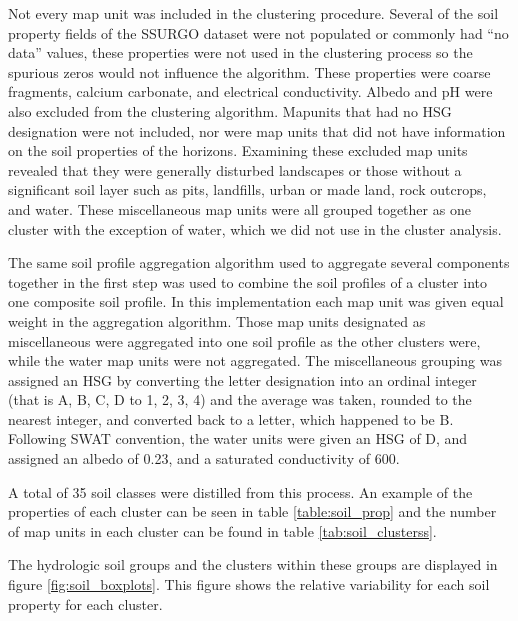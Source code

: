 Not every map unit was included in the clustering procedure. Several of the soil property fields of the SSURGO dataset were not populated or commonly had ``no data'' values, these properties were not used in the
clustering process so the spurious zeros would not influence the algorithm. These properties were coarse fragments, calcium carbonate, and electrical conductivity. Albedo and pH were also excluded from the clustering algorithm. Mapunits that had no HSG designation were not included, nor were map units that did not have information on the soil properties of the horizons. Examining these excluded map units revealed that they were generally disturbed landscapes or those without a significant soil layer such as pits, landfills, urban or made land, rock outcrops, and water. These miscellaneous map units were all grouped together as one cluster with the exception of water, which we did not use in the cluster analysis.

The same soil profile aggregation algorithm \citep{beaudette_algorithms_2013}
used to aggregate several components together in the first step was used to combine the soil profiles of a cluster into one
composite soil profile. In this implementation each map unit was given equal
weight in the aggregation algorithm. Those map units designated as miscellaneous
were aggregated into one soil profile as the other clusters were, while the
water map units were not aggregated. The miscellaneous grouping was assigned an
HSG by converting the letter designation into an ordinal
integer (that is A, B, C, D to 1, 2, 3, 4) and the average was taken, rounded to
the nearest integer, and converted back to a letter, which happened to be B. Following SWAT convention, the water units
were given an HSG of D, and assigned an albedo of 0.23, and a saturated conductivity
of 600.

A total of 35 soil classes were distilled from this process. An example of the properties of each cluster can be seen in table \ref{table:soil_prop} and the number of map units in each cluster can be found in table \ref{tab:soil_clusterss}. 

The hydrologic soil groups and the clusters within these groups are displayed in figure \ref{fig:soil_boxplots}. This figure shows the relative variability for each soil property for each cluster.

